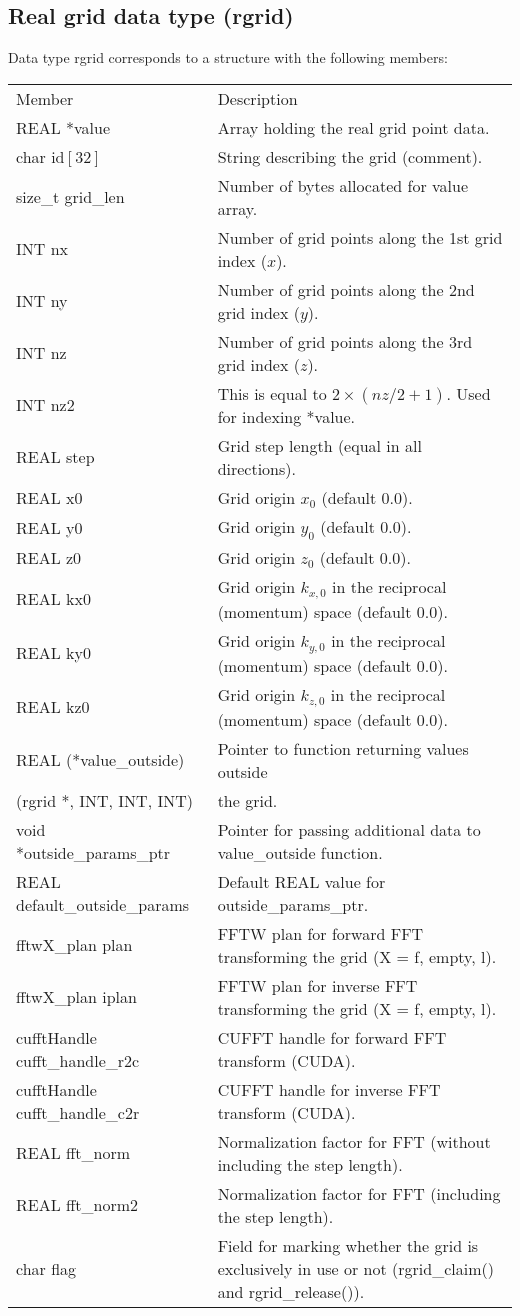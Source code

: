 \documentclass[12pt,letterpaper]{report}
\begin{document}
\subsection{Real grid data type (rgrid)}
Data type rgrid corresponds to a structure with the following members:
\begin{longtable}{p{} p{}}
Member & Description\\
\cline{1-2}
REAL *value & Array holding the real grid point data.\\
char id$[32]$ & String describing the grid (comment).\\
size\_t grid\_len & Number of bytes allocated for value array.\\
INT nx & Number of grid points along the 1st grid index ($x$).\\
INT ny & Number of grid points along the 2nd grid index ($y$).\\
INT nz & Number of grid points along the 3rd grid index ($z$).\\
INT nz2 & This is equal to $2\times(nz / 2 + 1)$. Used for indexing *value.\\
REAL step & Grid step length (equal in all directions).\\
REAL x0 & Grid origin $x_0$ (default 0.0).\\
REAL y0 & Grid origin $y_0$ (default 0.0).\\
REAL z0 & Grid origin $z_0$ (default 0.0).\\
REAL kx0 & Grid origin $k_{x,0}$ in the reciprocal (momentum) space (default 0.0).\\
REAL ky0 & Grid origin $k_{y,0}$ in the reciprocal (momentum) space (default 0.0).\\
REAL kz0 & Grid origin $k_{z,0}$ in the reciprocal (momentum) space (default 0.0).\\
REAL (*value\_outside) & Pointer to function returning values outside\\
\phantom{X}(rgrid *, INT, INT, INT) & the grid.\\
void *outside\_params\_ptr & Pointer for passing additional data to value\_outside function.\\
REAL default\_outside\_params & Default REAL value for outside\_params\_ptr.\\
fftwX\_plan plan & FFTW plan for forward FFT transforming the grid (X = f, empty, l).\\
fftwX\_plan iplan & FFTW plan for inverse FFT transforming the grid (X = f, empty, l).\\
cufftHandle cufft\_handle\_r2c & CUFFT handle for forward FFT transform (CUDA).\\
cufftHandle cufft\_handle\_c2r & CUFFT handle for inverse FFT transform (CUDA).\\
REAL fft\_norm & Normalization factor for FFT (without including the step length).\\
REAL fft\_norm2 & Normalization factor for FFT (including the step length).\\
char flag & Field for marking whether the grid is exclusively in use or not (rgrid\_claim() and rgrid\_release()).\\
\end{longtable}
\end{document}
